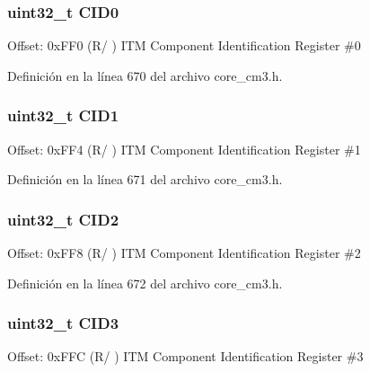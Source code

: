 \subsubsection[{\texorpdfstring{C\+I\+D0}{CID0}}]{ uint32\+\_\+t C\+I\+D0}\hypertarget{struct_i_t_m___type_ad613e91338bb994bde578b1a2fcbc1ec}{}\label{struct_i_t_m___type_ad613e91338bb994bde578b1a2fcbc1ec}
Offset\+: 0x\+F\+F0 (R/ ) I\+TM Component Identification Register \#0 

Definición en la línea 670 del archivo core\+\_\+cm3.\+h.

\subsubsection[{\texorpdfstring{C\+I\+D1}{CID1}}]{ uint32\+\_\+t C\+I\+D1}\hypertarget{struct_i_t_m___type_a67f499e16728f744c73dad3784d898d7}{}\label{struct_i_t_m___type_a67f499e16728f744c73dad3784d898d7}
Offset\+: 0x\+F\+F4 (R/ ) I\+TM Component Identification Register \#1 

Definición en la línea 671 del archivo core\+\_\+cm3.\+h.

\subsubsection[{\texorpdfstring{C\+I\+D2}{CID2}}]{ uint32\+\_\+t C\+I\+D2}\hypertarget{struct_i_t_m___type_ab36bf4236041f727b3e5cf2cfaa2aa04}{}\label{struct_i_t_m___type_ab36bf4236041f727b3e5cf2cfaa2aa04}
Offset\+: 0x\+F\+F8 (R/ ) I\+TM Component Identification Register \#2 

Definición en la línea 672 del archivo core\+\_\+cm3.\+h.

\subsubsection[{\texorpdfstring{C\+I\+D3}{CID3}}]{ uint32\+\_\+t C\+I\+D3}\hypertarget{struct_i_t_m___type_acb2fedfd1da6ff2a57d25fec513ffe25}{}\label{struct_i_t_m___type_acb2fedfd1da6ff2a57d25fec513ffe25}
Offset\+: 0x\+F\+FC (R/ ) I\+TM Component Identification Register \#3 


